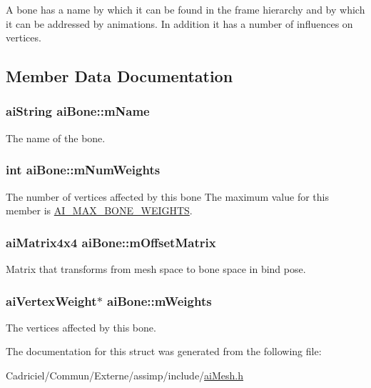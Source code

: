 A bone has a name by which it can be found in the frame hierarchy and by which it can be addressed by animations. In addition it has a number of influences on vertices. 

\subsection{Member Data Documentation}
\hypertarget{structai_bone_acfb9bfd2a2c6302181d7c3cc1bb8bbf0}{
\subsubsection[{m\-Name}]{ {\bf ai\-String} ai\-Bone\-::m\-Name}}\label{structai_bone_acfb9bfd2a2c6302181d7c3cc1bb8bbf0}


The name of the bone. 

\hypertarget{structai_bone_a87a79d42a0132753aac66397ad6f9b71}{
\subsubsection[{m\-Num\-Weights}]{ {\bf int} ai\-Bone\-::m\-Num\-Weights}}\label{structai_bone_a87a79d42a0132753aac66397ad6f9b71}
The number of vertices affected by this bone The maximum value for this member is \hyperlink{ai_mesh_8h_a565e88bbf36ef4957f1229609e51b7f6}{A\-I\-\_\-\-M\-A\-X\-\_\-\-B\-O\-N\-E\-\_\-\-W\-E\-I\-G\-H\-T\-S}. \hypertarget{structai_bone_a1dd6c4f24a1384c05da281692be3e78d}{
\subsubsection[{m\-Offset\-Matrix}]{ {\bf ai\-Matrix4x4} ai\-Bone\-::m\-Offset\-Matrix}}\label{structai_bone_a1dd6c4f24a1384c05da281692be3e78d}


Matrix that transforms from mesh space to bone space in bind pose. 

\hypertarget{structai_bone_ade36319714b58c03ad46aae30a2724a4}{
\subsubsection[{m\-Weights}]{ {\bf ai\-Vertex\-Weight}$\ast$ ai\-Bone\-::m\-Weights}}\label{structai_bone_ade36319714b58c03ad46aae30a2724a4}


The vertices affected by this bone. 



The documentation for this struct was generated from the following file\-:\begin{DoxyCompactItemize}
\item 
Cadriciel/\-Commun/\-Externe/assimp/include/\hyperlink{ai_mesh_8h}{ai\-Mesh.\-h}\end{DoxyCompactItemize}
